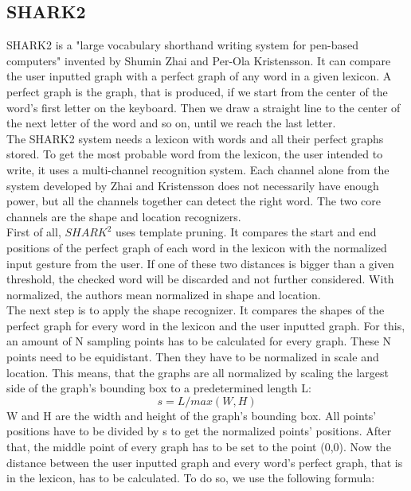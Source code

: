 \subsection{SHARK2}
SHARK2 is a "large vocabulary shorthand writing system for pen-based computers" \cite{Kristensson2004SHARK2AL} invented by Shumin Zhai and Per-Ola Kristensson. It can compare the user inputted graph with a perfect graph of any word in a given lexicon. A perfect graph is the graph, that is produced, if we start from the center of the word's first letter on the keyboard. Then we draw a straight line to the center of the next letter of the word and so on, until we reach the last letter.\\
The SHARK2 system needs a lexicon with words and all their perfect graphs stored. To get the most probable word from the lexicon, the user intended to write, it uses a multi-channel recognition system. Each channel alone from the system developed by Zhai and Kristensson \cite{Kristensson2004SHARK2AL} does not necessarily have enough power, but all the channels together can detect the right word. The two core channels are the shape and location recognizers.\\
First of all, $SHARK^2$ uses template pruning. It compares the start and end positions of the perfect graph of each word in the lexicon with the normalized input gesture from the user. If one of these two distances is bigger than a given threshold, the checked word will be discarded and not further considered. With normalized, the authors mean normalized in shape and location.\\
The next step is to apply the shape recognizer. It compares the shapes of the perfect graph for every word in the lexicon and the user inputted graph. For this, an amount of N sampling points has to be calculated for every graph. These N points need to be equidistant. Then they have to be normalized in scale and location. This means, that the graphs are all normalized by scaling the largest side of the graph's bounding box to a predetermined length L: 
\begin{equation}
    s = L / max(W,H)
\end{equation}
W and H are the width and height of the graph's bounding box. All points' positions have to be divided by s to get the normalized points' positions. After that, the middle point of every graph has to be set to the point (0,0). Now the distance between the user inputted graph and every word's perfect graph, that is in the lexicon, has to be calculated. To do so, we use the following formula:

